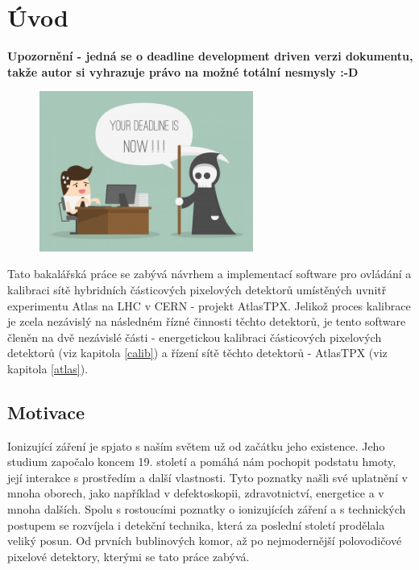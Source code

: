 

\chapter{Úvod}\label{chap01}
\textbf{Upozornění - jedná se o deadline development driven verzi dokumentu, takže autor si vyhrazuje právo na možné totální nesmysly :-D}

\begin{figure}[th]
	\begin{center}
		\includegraphics[width=7cm]{figures/ddd.jpg}
		\caption{}
	\end{center}
\end{figure}

Tato bakalářská práce se zabývá návrhem a implementací software pro ovládání a kalibraci sítě hybridních částicových pixelových detektorů umístěných uvnitř experimentu Atlas na LHC v CERN - projekt AtlasTPX. 
Jelikož proces kalibrace je zcela nezávislý na následném řízné činnosti těchto detektorů, je tento software členěn na dvě nezávislé části - energetickou kalibraci částicových pixelových detektorů (viz kapitola \ref{calib}) a řízení sítě těchto detektorů - AtlasTPX (viz kapitola \ref{atlas}).

\todo

\section{Motivace}
Ionizující záření je spjato s naším světem už od začátku jeho existence. Jeho studium započalo koncem 19. století a pomáhá nám pochopit podstatu hmoty, její interakce s prostředím a další vlastnosti. Tyto poznatky našli své uplatnění v mnoha oborech, jako například v defektoskopii, zdravotnictví, energetice a v mnoha dalších. Spolu s rostoucími poznatky o ionizujících záření a s technických postupem se rozvíjela i detekční technika, která za poslední století prodělala veliký posun. Od prvních bublinových komor, až po nejmodernější polovodičové pixelové detektory, kterými se tato práce zabývá. 


	
